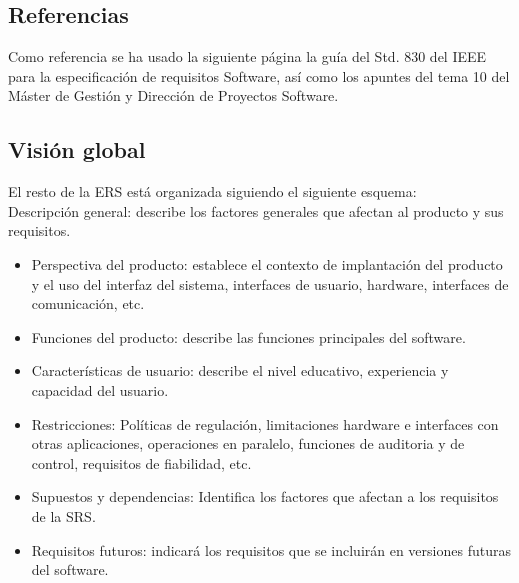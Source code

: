 \subsection{Referencias}
Como referencia se ha usado la siguiente página la guía del Std. 830 del IEEE para la especificación de requisitos Software, así como los apuntes del tema 10 del Máster de Gestión y Dirección de Proyectos Software.


\subsection{Visión global} 

El resto de la ERS está organizada siguiendo el siguiente esquema:\\


{\Large Descripción general:} describe los factores generales que afectan al producto y sus requisitos.
\begin{itemize}
\item Perspectiva del producto: establece el contexto de implantación del producto y el uso del interfaz del sistema, interfaces de usuario, hardware, interfaces de comunicación, etc.
\item Funciones del producto: describe las funciones principales del software.
\item Características de usuario: describe el nivel educativo, experiencia y capacidad del usuario.
\item Restricciones: Políticas de regulación, limitaciones hardware e interfaces con otras aplicaciones, operaciones en paralelo, funciones de auditoria y de control, requisitos de fiabilidad, etc.
\item Supuestos y dependencias: Identifica los factores que afectan a los requisitos de la SRS.
\item Requisitos futuros: indicará los requisitos que se incluirán en versiones futuras del software.
\end{itemize}

